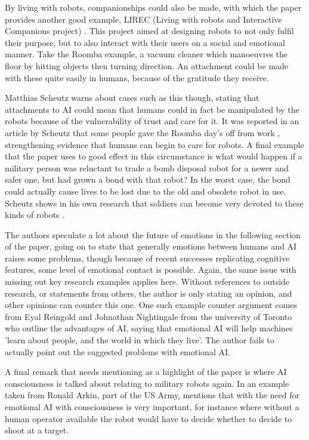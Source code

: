 \documentclass[article]{IEEEtran}
\begin{document}
By living with robots, companionships could also be made, with which the paper provides another good example, LIREC (Living with robots and Interactive Companions project) \cite{lirec}. This project aimed at designing robots to not only fulfil their purpose, but to also interact with their users on a social and emotional manner. Take the Roomba example, a vacuum cleaner which manoeuvres the floor by hitting objects then turning direction. An attachment could be made with these quite easily in humans, because of the gratitude they receive. \par
Matthias Scheutz warns about cases such as this though, stating that attachments to AI could mean that humans could in fact be manipulated by the robots because of the vulnerability of trust and care for it. It was reported in an article by Scheutz that some people gave the Roomba day's off from work \cite{ethicsMilitary}, strengthening evidence that humans can begin to care for robots. A final example that the paper uses to good effect in this circumstance is what would happen if a military person was reluctant to trade a bomb disposal robot for a newer and safer one, but had grown a bond with that robot? In the worst case, the bond could actually cause lives to be lost due to the old and obsolete robot in use. Scheutz shows in his own research that soldiers can become very devoted to these kinds of robots \cite{ethicsMilitary}. \par
The authors speculate a lot about the future of emotions in the following section of the paper, going on to state that generally emotions between humans and AI raises some problems, though because of recent successes replicating cognitive features, some level of emotional contact is possible. Again, the same issue with missing out key research examples applies here. Without references to outside research, or statements from others, the author is only stating an opinion, and other opinions can counter this one. One such example counter argument comes from Eyal Reingold and Johnathan Nightingale from the university of Toronto \cite{toronto} who outline the advantages of AI, saying that emotional AI will help machines 'learn about people, and the world in which they live'. The author fails to actually point out the suggested problems with emotional AI.\par
A final remark that needs mentioning as a highlight of the paper is where AI consciousness is talked about relating to military robots again. In an example taken from Ronald Arkin, part of the US Army, mentions that with the need for emotional AI with consciousness is very important, for instance where without a human operator available the robot would have to decide whether to decide to shoot at a target. \par
\end{document}
